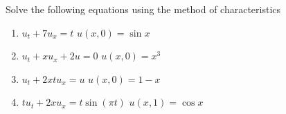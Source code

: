 \item Solve the following equations using the method of characteristics
\begin{enumerate}
  \item $u_t + 7u_x = t$ \quad $u(x, 0) = \sin x$
  \item $u_t + xu_x + 2u = 0$ \quad $u(x, 0) = x^3$
  \item $u_t + 2xtu_x = u$ \quad $u(x, 0) = 1 - x$
  \item $tu_t + 2xu_x = t\sin(\pi t)$ \quad $u(x, 1) = \cos x$
\end{enumerate}
\bigbreak
